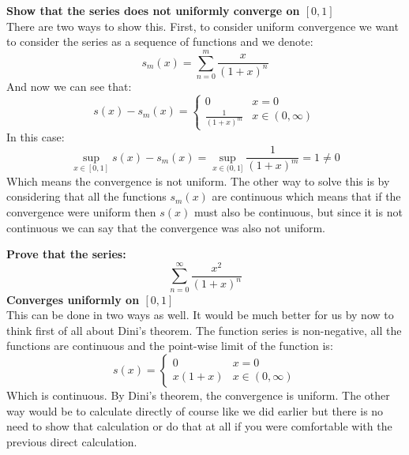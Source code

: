 \documentclass[11pt,a4paper]{article}
\begin{document}
	\newpage
	
	\textbf{Show that the series does not uniformly converge on $[0,1]$} \\
	There are two ways to show this. First, to consider uniform convergence
	we want to consider the series as a sequence of functions and we denote:
	\[
		s_m(x) = \sum_{n=0}^{m}{\frac{x}{(1+x)^n}}
	\]
	And now we can see that:
	\[
		s(x) - s_m(x) = \begin{cases}
			0 &x=0 \\
			\frac{1}{(1+x)^m} &x\in(0,\infty)
		\end{cases}
	\]
	In this case:
	\[
		\sup_{x\in[0,1]}{s(x) - s_m(x)} = 
		\sup_{x\in(0,1]}{\frac{1}{(1+x)^m}} = 1 \neq 0
	\]
	Which means the convergence is not uniform. The other way to solve
	this is by considering that all the functions $s_m(x)$ are continuous
	which means that if the convergence were uniform then $s(x)$ must
	also be continuous, but since it is not continuous we can say that
	the convergence was also not uniform.
	
	\newpage
	
	\textbf{Prove that the series:
	\[
		\sum_{n=0}^{\infty}{\frac{x^2}{(1+x)^n}}
	\]
	Converges uniformly on $[0,1]$} \\
	This can be done in two ways as well. It would be much better for us
	by now to think first of all about Dini's theorem. The function
	series is non-negative, all the functions are continuous and the
	point-wise limit of the function is:
	\[
		s(x) = \begin{cases}
			0 &x=0 \\
			x(1+x) &x\in(0,\infty)
		\end{cases}
	\]
	Which is continuous. By Dini's theorem, the convergence is uniform.
	The other way would be to calculate directly of course like we did
	earlier but there is no need to show that calculation or do that
	at all if you were comfortable with the previous direct calculation.
	
	\newpage
	
\end{document}
